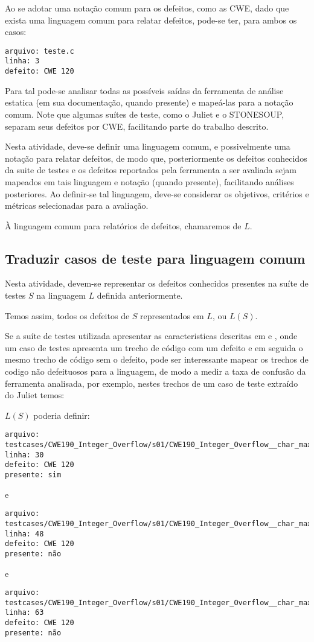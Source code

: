 Ao se adotar uma notação comum para os defeitos, como as CWE, dado que exista uma linguagem comum para relatar defeitos, pode-se ter, para ambos os casos:
\begin{lstlisting}
arquivo: teste.c
linha: 3
defeito: CWE 120
\end{lstlisting}
Para tal pode-se analisar todas as possíveis saídas da ferramenta de análise estatica (em sua documentação, quando presente) e mapeá-las para a notação comum. Note que algumas suítes de teste, como o Juliet e o STONESOUP, separam seus defeitos por CWE, facilitando parte do trabalho descrito.

Nesta atividade, deve-se definir uma linguagem comum, e possivelmente uma notação para relatar defeitos, de modo que, posteriormente os defeitos conhecidos da suite de testes e os defeitos reportados pela ferramenta a ser avaliada sejam mapeados em tais linguagem e notação (quando presente), facilitando análises posteriores. Ao definir-se tal linguagem, deve-se considerar os objetivos, critérios e métricas selecionadas para a avaliação.

À linguagem comum para relatórios de defeitos, chamaremos de $L$.

\subsection{Traduzir casos de teste para linguagem comum}

Nesta atividade, devem-se representar os defeitos conhecidos presentes na suíte de testes $S$ na linguagem $L$ definida anteriormente.

Temos assim, todos os defeitos de $S$ representados em $L$, ou $L(S)$.

Se a suíte de testes utilizada apresentar as caracteristicas descritas em \cite{nsa} e \cite{harvard}, onde um caso de testes apresenta um trecho de código com um defeito e em seguida o mesmo trecho de código sem o defeito, pode ser interessante mapear os trechos de codigo não defeituosos para a linguagem, de modo a medir a taxa de confusão da ferramenta analisada, por exemplo, nestes trechos de um caso de teste extraído do Juliet temos:

$L(S)$ poderia definir:
\begin{lstlisting}
arquivo: testcases/CWE190_Integer_Overflow/s01/CWE190_Integer_Overflow__char_max_add_01.c
linha: 30
defeito: CWE 120
presente: sim
\end{lstlisting}
e
\begin{lstlisting}
arquivo: testcases/CWE190_Integer_Overflow/s01/CWE190_Integer_Overflow__char_max_add_01.c
linha: 48
defeito: CWE 120
presente: não
\end{lstlisting}
e
\begin{lstlisting}
arquivo: testcases/CWE190_Integer_Overflow/s01/CWE190_Integer_Overflow__char_max_add_01.c
linha: 63
defeito: CWE 120
presente: não
\end{lstlisting}

